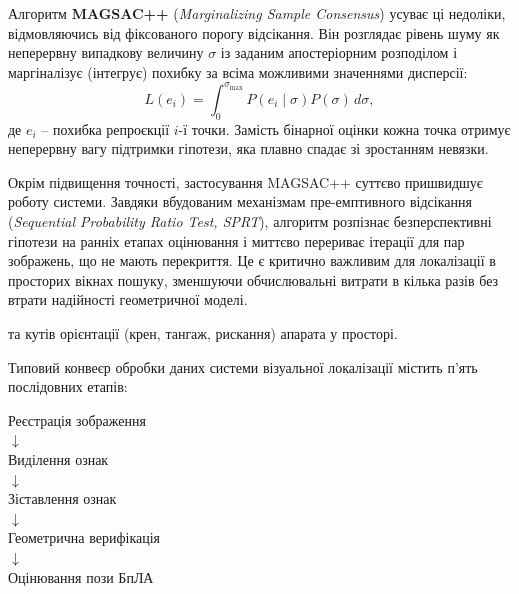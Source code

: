 \documentclass[a4paper, 12pt, titlepage]{article}
\begin{document}
Алгоритм \textbf{MAGSAC++} (\textit{Marginalizing Sample Consensus}) \cite{magsac} усуває ці недоліки, відмовляючись від фіксованого порогу відсікання. Він розглядає рівень шуму як неперервну випадкову величину $\sigma$ із заданим апостеріорним розподілом і маргіналізує (інтегрує) похибку за всіма можливими значеннями дисперсії:
\begin{equation}
L(e_i) = \int_0^{\sigma_{\max}} P(e_i \mid \sigma) P(\sigma) \, d\sigma,
\end{equation}
де $e_i$ -- похибка репроєкції $i$-ї точки. Замість бінарної оцінки кожна точка отримує неперервну вагу підтримки гіпотези, яка плавно спадає зі зростанням невязки.

Окрім підвищення точності, застосування MAGSAC++ суттєво пришвидшує роботу системи. Завдяки вбудованим механізмам пре-емптивного відсікання (\textit{Sequential Probability Ratio Test, SPRT}), алгоритм розпізнає безперспективні гіпотези на ранніх етапах оцінювання і миттєво перериває ітерації для пар зображень, що не мають перекриття. Це є критично важливим для локалізації в просторих вікнах пошуку, зменшуючи обчислювальні витрати в кілька разів без втрати надійності геометричної моделі.

 та кутів орієнтації (крен, тангаж, рискання) апарата у просторі.

Типовий конвеєр обробки даних системи візуальної локалізації містить п'ять послідовних етапів:

\begin{center}
\begin{minipage}{0.6\textwidth}
\ttfamily
\centering
Реєстрація зображення \\
$\downarrow$ \\
Виділення ознак \\
$\downarrow$ \\
Зіставлення ознак \\
$\downarrow$ \\
Геометрична верифікація \\
$\downarrow$ \\
Оцінювання пози БпЛА
\end{minipage}
\end{center}
\vspace{0.3cm}
\end{document}
